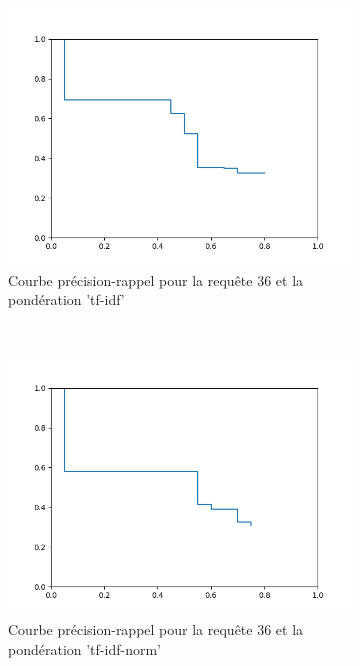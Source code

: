 \documentclass[12pt,a4paper]{article}
\begin{document}
\begin{figure}[htbp]
\centering
\begin{subfigure}[b]{0.27\textwidth}
	\centering \includegraphics[width=\textwidth]{36_tf_ifd.png}
	\caption{Courbe précision-rappel pour la requête $36$ et la pondération 'tf-idf'}
	\label{fig:precision-recall-1}
	\end{subfigure}
~
\begin{subfigure}[b]{0.27\textwidth}
	\centering \includegraphics[width=\textwidth]{36_tf_ifd_norm.png}
	\caption{Courbe précision-rappel pour la requête $36$ et la pondération 'tf-idf-norm'}
	\label{fig:precision-recall-2}
	\end{subfigure}
~
\begin{subfigure}[b]{0.27\textwidth}

\end{subfigure}
\end{figure}
\end{document}

